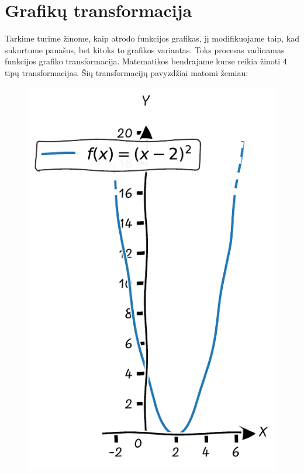 \documentclass{tufte-handout}
\begin{document}
\section{Grafikų transformacija}\label{sec:graph_transformation}

Tarkime turime žinome, kaip atrodo funkcijos grafikas, jį modifikuojame taip,
kad sukurtume panašus, bet kitoks to grafikos variantas. Toks procesas
vadinamas funkcijos grafiko transformacija. Matematikos bendrajame kurse reikia
žinoti 4 tipų transformacijas. Šių transformacijų pavyzdžiai matomi žemiau:

\begin{figure}[h]
  \begin{minipage}{0.22\textwidth}
    \includegraphics[width=\linewidth]{./graphs/quadratic_func_lsh_2.pdf}

\end{minipage}
\end{figure}
\end{document}
